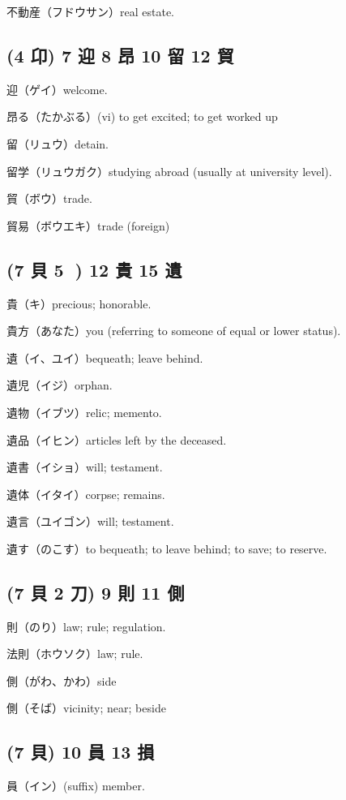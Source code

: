 不動産（フドウサン）real estate.

\subsection{(4 卬) 7 迎 8 昂 10 留 12 貿}

迎（ゲイ）welcome.

昂る（たかぶる）(vi) to get excited; to get worked up

留（リュウ）detain.

留学（リュウガク）studying abroad (usually at university level).

貿（ボウ）trade.

貿易（ボウエキ）trade (foreign)

\subsection{(7 貝 5 𠀐) 12 貴 15 遺}

貴（キ）precious; honorable.

貴方（あなた）you (referring to someone of equal or lower status).

遺（イ、ユイ）bequeath; leave behind.

遺児（イジ）orphan.

遺物（イブツ）relic; memento.

遺品（イヒン）articles left by the deceased.

遺書（イショ）will; testament.

遺体（イタイ）corpse; remains.

遺言（ユイゴン）will; testament.

遺す（のこす）to bequeath; to leave behind; to save; to reserve.

\subsection{(7 貝 2 刀) 9 則 11 側}

則（のり）law; rule; regulation.

法則（ホウソク）law; rule.

側（がわ、かわ）side

側（そば）vicinity; near; beside

\subsection{(7 貝) 10 員 13 損}

員（イン）(suffix) member.

